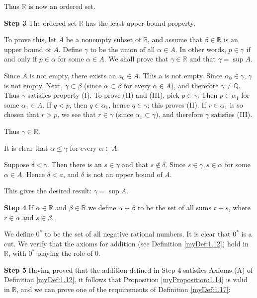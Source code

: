 Thus $\mathbb{R}$ is now an ordered set.


\textbf{Step 3}
The ordered set $\mathbb{R}$ has the least-upper-bound property.

To prove this, let $A$ be a nonempty subset of $\mathbb{R}$, and assume that $\beta \in \mathbb{R}$ is an upper bound of $A$. Define $\gamma$ to be the union of all $\alpha \in A$. In other words, $p\in \gamma$ if and only if $p \in \alpha$ for some $\alpha \in A$. We shall prove that $\gamma \in \mathbb{R}$ and that $\gamma = \sup A$.

Since $A$ is not empty, there exists an $a_0 \in A$. This a is not empty. Since $\alpha_0 \in \gamma$, $\gamma$ is not empty. Next, $\gamma \subset \beta$ (since $\alpha \subset \beta$ for every $\alpha \in A$), and therefore $\gamma \neq \mathbb{Q}$. Thus $\gamma$ satisfies property (I). To prove (II) and (III), pick $p \in \gamma$. Then $p \in \alpha_1$ for some $\alpha_1 \in A$. If $q <p$, then $q \in \alpha_1$, hence $q \in \gamma$; this proves (II). If $r \in \alpha_1$ is so chosen that $r > p$, we see that $r\in \gamma$ (since $\alpha_1 \subset \gamma$), and therefore $\gamma$
satisfies (III).

Thus $\gamma \in \mathbb{R}$.

It is clear that $\alpha \leq \gamma$ for every $\alpha \in A$.

Suppose $\delta < \gamma$. Then there is an $s \in \gamma$ and that $s \not\in \delta$. Since $s \in \gamma, s \in \alpha$
for some $\alpha \in A$. Hence $\delta <a$, and $\delta$ is not an upper bound of $A$.

This gives the desired result: $\gamma = \sup A$.


\textbf{Step 4} If $\alpha \in \mathbb{R}$ and $\beta \in \mathbb{R}$ we define $\alpha + \beta$ to be the set of all sums $r + s$, where
$r \in \alpha$ and $s \in \beta$.

We define $0^*$ to be the set of all negative rational numbers. It is clear that $0^*$ is a cut. We verify that the axioms for addition (see Definition \ref{myDef:1.12}) hold in
$\mathbb{R}$, with $0^*$ playing the role of $0$.

\textbf{Step 5} Having proved that the addition defined in Step 4 satisfies Axioms (A) of Definition \ref{myDef:1.12}, it follows that Proposition \ref{myProposition:1.14} is valid in $\mathbb{R}$, and we can
prove one of the requirements of Definition \ref{myDef:1.17}:

